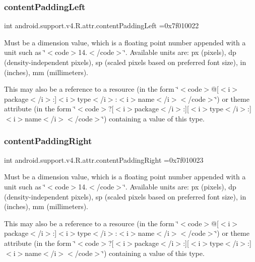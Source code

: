 \subsubsection{\texorpdfstring{content\+Padding\+Left}{contentPaddingLeft}}
{\footnotesize\ttfamily int android.\+support.\+v4.\+R.\+attr.\+content\+Padding\+Left =0x7f010022\hspace{0.3cm}{\ttfamily [static]}}

Must be a dimension value, which is a floating point number appended with a unit such as \char`\"{}$<$code$>$14.\+5sp$<$/code$>$\char`\"{}. Available units are\+: px (pixels), dp (density-\/independent pixels), sp (scaled pixels based on preferred font size), in (inches), mm (millimeters). 

This may also be a reference to a resource (in the form \char`\"{}$<$code$>$@\mbox{[}$<$i$>$package$<$/i$>$\+:\mbox{]}$<$i$>$type$<$/i$>$\+:$<$i$>$name$<$/i$>$$<$/code$>$\char`\"{}) or theme attribute (in the form \char`\"{}$<$code$>$?\mbox{[}$<$i$>$package$<$/i$>$\+:\mbox{]}\mbox{[}$<$i$>$type$<$/i$>$\+:\mbox{]}$<$i$>$name$<$/i$>$$<$/code$>$\char`\"{}) containing a value of this type. \mbox{\label{classandroid_1_1support_1_1v4_1_1R_1_1attr_af6d3428e88c6646dba8ee41c07f71d8c}} 
\subsubsection{\texorpdfstring{content\+Padding\+Right}{contentPaddingRight}}
{\footnotesize\ttfamily int android.\+support.\+v4.\+R.\+attr.\+content\+Padding\+Right =0x7f010023\hspace{0.3cm}{\ttfamily [static]}}

Must be a dimension value, which is a floating point number appended with a unit such as \char`\"{}$<$code$>$14.\+5sp$<$/code$>$\char`\"{}. Available units are\+: px (pixels), dp (density-\/independent pixels), sp (scaled pixels based on preferred font size), in (inches), mm (millimeters). 

This may also be a reference to a resource (in the form \char`\"{}$<$code$>$@\mbox{[}$<$i$>$package$<$/i$>$\+:\mbox{]}$<$i$>$type$<$/i$>$\+:$<$i$>$name$<$/i$>$$<$/code$>$\char`\"{}) or theme attribute (in the form \char`\"{}$<$code$>$?\mbox{[}$<$i$>$package$<$/i$>$\+:\mbox{]}\mbox{[}$<$i$>$type$<$/i$>$\+:\mbox{]}$<$i$>$name$<$/i$>$$<$/code$>$\char`\"{}) containing a value of this type. \mbox{\label{classandroid_1_1support_1_1v4_1_1R_1_1attr_a01bcbd68cfb27fa9bff4ff401c9174de}} 

